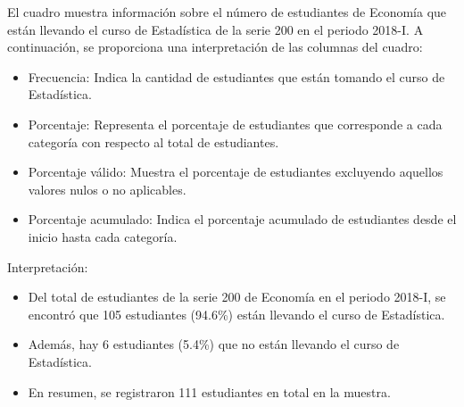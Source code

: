 \documentclass[
  letterpaper,
  DIV=11,
  numbers=noendperiod]{scrartcl}
\providecommand{\tightlist}{%
  \setlength{\itemsep}{0pt}\setlength{\parskip}{0pt}}\usepackage{longtable,booktabs,array}
\begin{document}
El cuadro muestra información sobre el número de estudiantes de Economía
que están llevando el curso de Estadística de la serie 200 en el periodo
2018-I. A continuación, se proporciona una interpretación de las
columnas del cuadro:

\begin{itemize}
\tightlist
\item
  Frecuencia: Indica la cantidad de estudiantes que están tomando el
  curso de Estadística.
\item
  Porcentaje: Representa el porcentaje de estudiantes que corresponde a
  cada categoría con respecto al total de estudiantes.
\item
  Porcentaje válido: Muestra el porcentaje de estudiantes excluyendo
  aquellos valores nulos o no aplicables.
\item
  Porcentaje acumulado: Indica el porcentaje acumulado de estudiantes
  desde el inicio hasta cada categoría.
\end{itemize}

Interpretación:

\begin{itemize}
\tightlist
\item
  Del total de estudiantes de la serie 200 de Economía en el periodo
  2018-I, se encontró que 105 estudiantes (94.6\%) están llevando el
  curso de Estadística.
\item
  Además, hay 6 estudiantes (5.4\%) que no están llevando el curso de
  Estadística.
\item
  En resumen, se registraron 111 estudiantes en total en la muestra.
\end{itemize}
\end{document}

